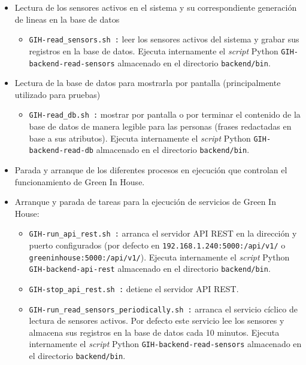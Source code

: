 \begin{itemize}
\begin{itemize}
            \end{itemize}
            \item Lectura de los sensores activos en el sistema y su correspondiente generación de lineas en la base de datos    
            \begin{itemize}
                \item \texttt{GIH-read\_sensors.sh :} leer los sensores activos del sistema y grabar sus registros en la base de datos. Ejecuta internamente el \textit{script} Python \texttt{GIH-backend-read-sensors} almacenado en el directorio \texttt{backend/bin}.
            \end{itemize}
            \item Lectura de la base de datos para mostrarla por pantalla (principalmente utilizado para pruebas)   
            \begin{itemize}
                \item \texttt{GIH-read\_db.sh :} mostrar por pantalla o por terminar el contenido de la base de datos de manera legible para las personas (frases redactadas en base a sus atributos). Ejecuta internamente el \textit{script} Python \texttt{GIH-backend-read-db} almacenado en el directorio \texttt{backend/bin}.
            \end{itemize}
            \item Parada y arranque de los diferentes procesos en ejecución que controlan el funcionamiento de Green In House.    
            \item Arranque y parada de tareas para la ejecución de servicios de Green In House:
            \begin{itemize}
                \item \texttt{GIH-run\_api\_rest.sh :} arranca el servidor API REST en la dirección y puerto configurados (por defecto en \texttt{192.168.1.240:5000:/api/v1/} o \texttt{greeninhouse:5000:/api/v1/}). Ejecuta internamente el \textit{script} Python \texttt{GIH-backend-api-rest} almacenado en el directorio \texttt{backend/bin}.
                \item \texttt{GIH-stop\_api\_rest.sh :} detiene el servidor API REST.
                \item \texttt{GIH-run\_read\_sensors\_periodically.sh :} arranca el servicio cíclico de lectura de sensores activos. Por defecto este servicio lee los sensores y almacena sus registros en la base de datos cada 10 minutos. Ejecuta internamente el \textit{script} Python \texttt{GIH-backend-read-sensors} almacenado en el directorio \texttt{backend/bin}.

\end{itemize}
\end{itemize}
